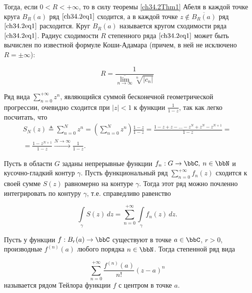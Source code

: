 Тогда, если $0 < R < +\infty$, то в силу теоремы \ref{ch34.2Thm1} Абеля в каждой точке круга $B_R(a)$ ряд $\eqref{ch34.2eq1}$ сходится, а в каждой точке $z \notin \overline{B_R(a)}$ ряд $\eqref{ch34.2eq1}$ расходится. Круг $B_R(a)$ называется кругом сходимости ряда $\eqref{ch34.2eq1}$.
Радиус сходимости $R$ степенного ряда $\eqref{ch34.2eq1}$ может быть вычислен по известной формуле Коши-Адамара (причем, в ней не исключено $R=\pm\infty$):

\begin{equation} \label{ch34.2eq3}
R = \frac{1}{\overline{\lim\limits_{n \to \infty}} \sqrt[n]{|c_n|}}
\end{equation}

\begin{exmpl} \label{exmpl2}
Ряд вида $\sum\limits_{n = 0}^{+\infty} z^n$, являющийся суммой бесконечной геометрической прогрессии, очевидно сходится при $|z| < 1$ к функции $\frac{1}{1 - z}$, так как легко посчитать, что
\begin{multline*}
S_N(z) \triangleq \sum\limits_{n = 0}^{N} z^n = \left( \sum\limits_{n = 0}^{N} z^n \right) \frac{1 - z}{1 - z} =\frac{1-z+z-\dots-z^N+z^N-z^{N+1}}{1-z}=\\= \frac{1 - z^{N + 1}}{1 - z}  \xrightarrow{N \to \infty} \frac{1}{1 - z}.
\end{multline*}

\end{exmpl} 
\begin{stt} \label{ch34stt1000}
Пусть в области $G$ заданы непрерывные функции $f_n: G \to \bbC, \: n \in \bbN$ и кусочно-гладкий контур $\gamma$. Пусть функциональный ряд $\sum\limits_{n = 0}^{+\infty}f_n(z)$ сходится к своей сумме $S(z)$ равномерно на контуре $\gamma$. Тогда этот ряд можно почленно интегрировать по контуру $\gamma$, т.е. справедливо равенство 

\begin{equation} \label{ch34eq1000} 
\int\limits_{\gamma}S(z) \,dz = \sum\limits_{n = 0}^{+\infty} \int\limits_{\gamma} f_n(z) \,dz. 
\end{equation} 

\end{stt}
\begin{defn}
Пусть у функции $f : B_r(a) \to \bbC$ существуют в точке $a \in \bbC$, $r > 0$, производные $f^{(n)}(a)$ любого порядка $n \in \bbN$. Тогда степенной ряд вида

\begin{equation} \label{ch34.2eq4}
\sum\limits_{n = 0}^{+\infty} \frac{f^{(n)}(a)}{n!} (z - a)^n
\end{equation}
называется $\textit{рядом Тейлора функции f}$ с центром в точке $a$.
\end{defn}

